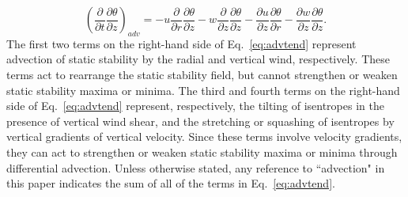 \documentclass{ametsoc}
\begin{document}
   \begin{equation} \label{eq:advtend}
   \left(\frac{\partial}{\partial t}\frac{\partial \theta}{\partial z}\right)_{adv} = -u\frac{\partial}{\partial r}\frac{\partial \theta}{\partial z}-w\frac{\partial}{\partial z}\frac{\partial \theta}{\partial z}-\frac{\partial u}{\partial z}\frac{\partial \theta}{\partial r}-\frac{\partial w}{\partial z}\frac{\partial \theta}{\partial z}.
   \end{equation}
The first two terms on the right-hand side of Eq.~\ref{eq:advtend} represent advection of static stability by the radial and vertical wind, respectively.
These terms act to rearrange the static stability field, but cannot strengthen or weaken static stability maxima or minima.
The third and fourth terms on the right-hand side of Eq.~\ref{eq:advtend} represent, respectively, the tilting of isentropes in the presence of vertical wind shear, and the stretching or squashing of isentropes by vertical gradients of vertical velocity.
Since these terms involve velocity gradients, they can act to strengthen or weaken static stability maxima or minima through differential advection.
Unless otherwise stated, any reference to ``advection" in this paper indicates the sum of all of the terms in Eq.~\ref{eq:advtend}.
\end{document}
